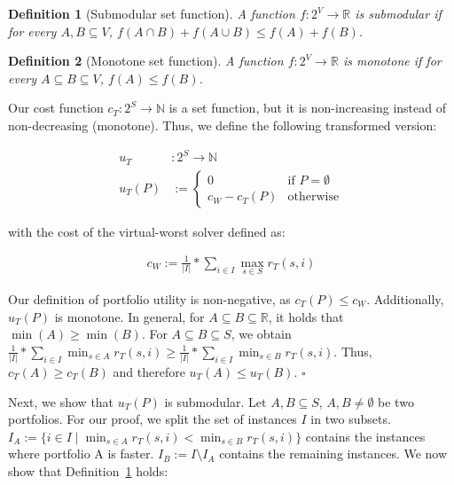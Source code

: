 \documentclass[conference]{IEEEtran}
\newtheorem{definition}{Definition}
\begin{document}
\begin{definition}[Submodular set function]
	A function $f : 2^V \rightarrow \mathbb{R}$ is submodular if for every $A, B \subseteq V$, $f(A \cap B) + f(A \cup B) \leq f(A) + f(B)$.
	\label{def:submodular}
\end{definition}

\begin{definition}[Monotone set function]
	A function $f : 2^V \rightarrow \mathbb{R}$ is monotone if for every $A \subseteq B \subseteq V$, $f(A) \leq f(B)$.
	\label{def:monotone}
\end{definition}

Our cost function $c_{T}: 2^S \rightarrow \mathbb{N}$ is a set function, but it is non-increasing instead of non-decreasing (monotone).
Thus, we define the following transformed version:

\begin{align*}
	u_{T} &: 2^S \rightarrow \mathbb{N}\\
	u_{T}(P) &:= \begin{cases}
		0 & \text{if }P=\emptyset\\
		c_W - c_{T}(P) & \text{otherwise}
	\end{cases} \tag*{Portfolio Utility}
\end{align*}

with the cost of the virtual-worst solver defined as:

\begin{align*}
	c_W := \frac{1}{|I|} * \sum_{i \in I}{\max_{s \in S}{r_T(s,i)}} \tag*{Virtual Worst Solver}
\end{align*}

Our definition of portfolio utility is non-negative, as $c_{T}(P) \leq c_W$.
Additionally, $u_{T}(P)$ is monotone.
In general, for $A \subseteq B \subseteq \mathbb{R}$, it holds that $\min(A) \geq \min(B)$.
For $A \subseteq B \subseteq S$, we obtain $\frac{1}{|I|} * \sum_{i \in I}{\min_{s \in A}{r_T(s,i)}} \geq \frac{1}{|I|} * \sum_{i \in I}{\min_{s \in B}{r_T(s,i)}}$.
Thus, $c_{T}(A) \geq c_{T}(B)$ and therefore $u_{T}(A) \leq u_{T}(B)$. \hfill$\square$

Next, we show that $u_{T}(P)$ is submodular.
Let $A,B \subseteq S$, $A,B \neq \emptyset$ be two portfolios.
For our proof, we split the set of instances $I$ in two subsets.
$I_A := \{i \in I \mid \min_{s \in A}{r_T(s,i)} < \min_{s \in B}{r_T(s,i)} \}$ contains the instances where portfolio A is faster.
$I_B := I \setminus I_A$ contains the remaining instances.
We now show that Definition~\ref{def:submodular} holds:
\end{document}
